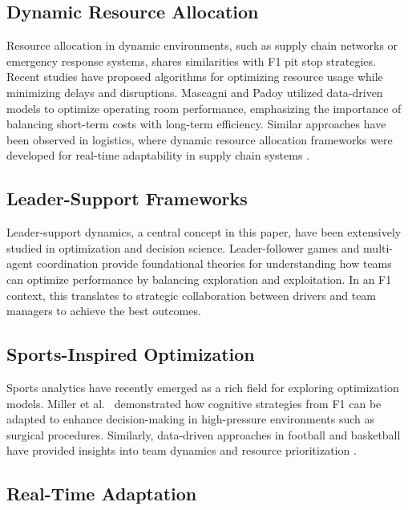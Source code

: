 \documentclass[preprint,12pt]{elsarticle}
\begin{document}
\subsection{Dynamic Resource Allocation}

Resource allocation in dynamic environments, such as supply chain networks or emergency response systems, shares similarities with F1 pit stop strategies. Recent studies have proposed algorithms for optimizing resource usage while minimizing delays and disruptions. Mascagni and Padoy \cite{mascagni2021or} utilized data-driven models to optimize operating room performance, emphasizing the importance of balancing short-term costs with long-term efficiency. Similar approaches have been observed in logistics, where dynamic resource allocation frameworks were developed for real-time adaptability in supply chain systems \cite{ramos2022agile}.

\subsection{Leader-Support Frameworks}

Leader-support dynamics, a central concept in this paper, have been extensively studied in optimization and decision science. Leader-follower games \cite{kianfar2021leader} and multi-agent coordination \cite{miller2020cognitive} provide foundational theories for understanding how teams can optimize performance by balancing exploration and exploitation. In an F1 context, this translates to strategic collaboration between drivers and team managers to achieve the best outcomes.

\subsection{Sports-Inspired Optimization}

Sports analytics have recently emerged as a rich field for exploring optimization models. Miller et al.\ \cite{miller2020cognitive} demonstrated how cognitive strategies from F1 can be adapted to enhance decision-making in high-pressure environments such as surgical procedures. Similarly, data-driven approaches in football and basketball have provided insights into team dynamics and resource prioritization \cite{ramos2022sports, wooldridge2023team}.

\subsection{Real-Time Adaptation}
\end{document}
